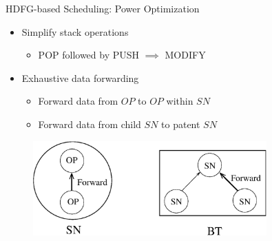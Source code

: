 \documentclass[handout]{beamer}
\begin{document}
\begin{CJK}{UTF8}{bkai}
            \begin{frame}{HDFG-based Scheduling: Power Optimization}
                \begin{itemize}
                    \pause
                    \item {
                            Simplify stack operations
                            \begin{itemize}
                                \item POP followed by PUSH $\implies$ MODIFY
                            \end{itemize}
                        }
                    \pause
                    \item {
                            Exhaustive data forwarding
                            \begin{itemize}
                                \item Forward data from $OP$ to $OP$ within $SN$
                                \item Forward data from child $SN$ to patent $SN$
                            \end{itemize}
                        }
                \end{itemize}
                \pause
                \begin{figure}[!ht] 
                    \centering
                    \includegraphics[width=0.8\textwidth]{./figs/power_opt}
                    \label{fig:archi}
                \end{figure}
            \end{frame}

\end{CJK}
\end{document}
